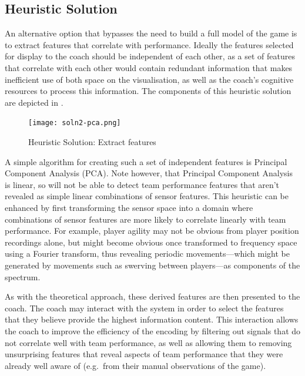 \subsection{Heuristic Solution}\label{sec:heuristic-solution-2}

An alternative option that bypasses the need to build a full model of
the game is to extract features that correlate with performance. Ideally
the features selected for display to the coach should be independent of
each other, as a set of features that correlate with each other would
contain redundant information that makes inefficient use of both space
on the visualisation, as well as the coach's cognitive resources to
process this information. The components of this heuristic solution are
depicted in .

\begin{figure}[htbp]
\centering
\texttt{[image: soln2-pca.png]}
\caption{Heuristic Solution: Extract features \label{fig:soln2-pca}}
\end{figure}

A simple algorithm for creating such a set of independent features is
Principal Component Analysis (PCA). Note however, that Principal
Component Analysis is linear, so will not be able to detect team
performance features that aren't revealed as simple linear combinations
of sensor features. This heuristic can be enhanced by first transforming
the sensor space into a domain where combinations of sensor features are
more likely to correlate linearly with team performance. For example,
player agility may not be obvious from player position recordings alone,
but might become obvious once transformed to frequency space using a
Fourier transform, thus revealing periodic movements---which might be
generated by movements such as swerving between players---as components
of the spectrum.

As with the theoretical approach, these derived features are then presented to
the coach. The coach may interact with the system in order to select the
features that they believe provide the highest information content. This
interaction allows the coach to improve the efficiency of the encoding
by filtering out signals that do not correlate well with team
performance, as well as allowing them to removing unsurprising features
that reveal aspects of team performance that they were already well
aware of (e.g.~from their manual observations of the game).

